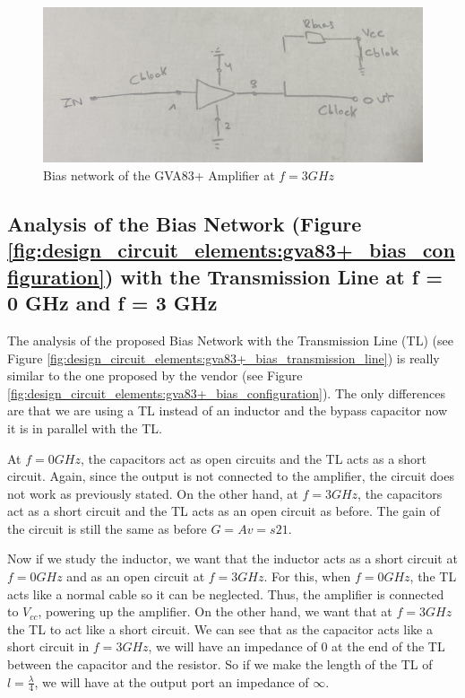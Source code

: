 \documentclass[12pt]{report} %
\begin{document}
\begin{figure}[htbp]
    \centering
    \includegraphics[width=\textwidth]{images/design_circuit_elements/gva83+_bias_f_3_ghz.png}
    \caption{Bias network of the GVA83+ Amplifier at $f = 3 GHz$}
    \label{fig:design_circuit_elements:gva83+_bias_f_3_ghz}
\end{figure}

\subsection{Analysis of the Bias Network (Figure \ref{fig:design_circuit_elements:gva83+_bias_configuration}) with the Transmission Line at f = 0 GHz and f = 3 GHz}

The analysis of the proposed Bias Network with the Transmission Line (TL) (see Figure \ref{fig:design_circuit_elements:gva83+_bias_transmission_line}) is really similar to the one proposed by the vendor (see Figure \ref{fig:design_circuit_elements:gva83+_bias_configuration}). The only differences are that we are using a TL instead of an inductor and the bypass capacitor now it is in parallel with the TL.

At $f = 0 GHz$, the capacitors act as open circuits and the TL acts as a short circuit. Again, since the output is not connected to the amplifier, the circuit does not work as previously stated. On the other hand, at $f = 3 GHz$, the capacitors act as a short circuit and the TL acts as an open circuit as before. The gain of the circuit is still the same as before $G = Av = s{21}$.

Now if we study the inductor, we want that the inductor acts as a short circuit at $f = 0 GHz$ and as an open circuit at $f = 3 GHz$. For this, when $f = 0 GHz$, the TL acts like a normal cable so it can be neglected. Thus, the amplifier is connected to $V_{cc}$, powering up the amplifier. On the other hand, we want that at $f = 3 GHz$ the TL to act like a short circuit. We can see that as the capacitor acts like a short circuit in $f = 3 GHz$, we will have an impedance of 0 at the end of the TL between the capacitor and the resistor. So if we make the length of the TL of $l = \frac{\lambda}{4}$, we will have at the output port an impedance of $\infty$.
\end{document}
